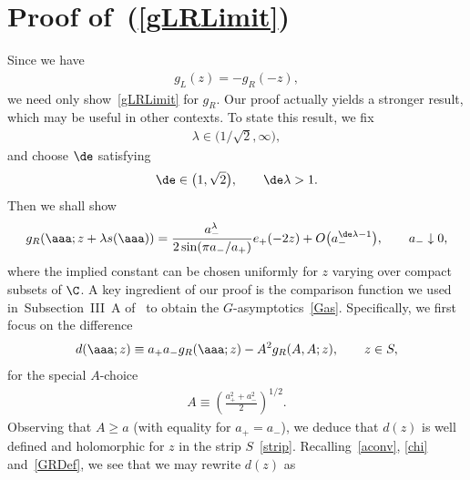 \documentclass[pdftex]{sigma}
\numberwithin{equation}{section}
\begin{document}


\section{Proof of~(\ref{gLRLimit})}\label{appendixB}


Since we have
\begin{gather}
g_L(z)=-g_R(-z),
\end{gather}
we need only show~\eqref{gLRLimit} for $g_R$. Our proof actually yields a stronger result, which may be useful in other contexts. To state this result, we f\/ix
\begin{gather}
\lambda \in \big(1/\sqrt{2},\infty\big),
\end{gather}
and choose $\de$ satisfying
\begin{gather}
\de\in\big(1,\sqrt{2}\big),\qquad \de\lambda>1.
\end{gather}
Then we shall show
\begin{gather}\label{gRb}
g_R(\aaa;z+\lambda s(\aaa))=\frac{a_-^{\lambda }}{2\sin(\pi a_-/a_+)}e_+(-2z)+O\big(a_-^{\de \lambda -1}\big),\qquad
 a_-\downarrow 0,
\end{gather}
where the implied constant can be chosen uniformly for $z$ varying over compact subsets of $\C$.
A key ingredient of our proof is the comparison function we used in~Subsection~III~A of~\cite{fo} to obtain the $G$-asymptotics~\eqref{Gas}. Specif\/ically, we f\/irst focus on the dif\/ference
\begin{gather}\label{defd}
d(\aaa;z)\equiv a_+a_-g_R(\aaa;z)-A^2g_R(A,A;z),\qquad z\in S,
\end{gather}
 for the special $A$-choice
\begin{gather}\label{Ac}
A\equiv \left(\frac{a_+^2+a_-^2}{2}\right)^{1/2}.
\end{gather}
Observing that $A\ge a$ (with equality for $a_+=a_-$), we deduce that $d(z)$ is well def\/ined and holomorphic for $z$ in the strip $S$~\eqref{strip}.
Recalling~\eqref{aconv}, \eqref{chi} and~\eqref{GRDef}, we see that we may rewrite $d(z)$ as
\end{document}
